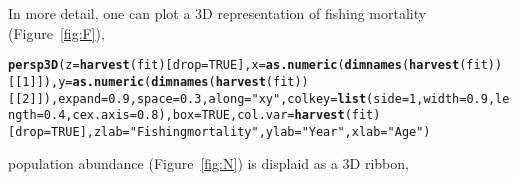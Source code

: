 \documentclass[a4paper,english,10pt]{article}\usepackage[]{graphicx}\usepackage[]{color}
\makeatletter
\newcommand{\hlnum}[1]{\textcolor[rgb]{0.686,0.059,0.569}{#1}}%
\newcommand{\hlstr}[1]{\textcolor[rgb]{0.192,0.494,0.8}{#1}}%
\newcommand{\hlstd}[1]{\textcolor[rgb]{0.345,0.345,0.345}{#1}}%
\newcommand{\hlkwc}[1]{\textcolor[rgb]{0.333,0.667,0.333}{#1}}%
\newcommand{\hlkwd}[1]{\textcolor[rgb]{0.737,0.353,0.396}{\textbf{#1}}}%
\newenvironment{kframe}{%
 \def\at@end@of@kframe{}%
 \ifinner\ifhmode%
  \def\at@end@of@kframe{\end{minipage}}%
  \begin{minipage}{\columnwidth}%
 \fi\fi%
 \def\FrameCommand##1{\hskip\@totalleftmargin \hskip-\fboxsep
 \colorbox{shadecolor}{##1}\hskip-\fboxsep
     \hskip-\linewidth \hskip-\@totalleftmargin \hskip\columnwidth}%
 \MakeFramed {\advance\hsize-\width
   \@totalleftmargin\z@ \linewidth\hsize
   \@setminipage}}%
 {\par\unskip\endMakeFramed%
 \at@end@of@kframe}
\newenvironment{knitrout}{}{} %
\makeatother
\begin{document}
In more detail, one can plot a 3D representation of fishing mortality (Figure~\ref{fig:F}),

\begin{knitrout}
\color{fgcolor}\begin{kframe}
\begin{alltt}
\hlkwd{persp3D}\hlstd{(}\hlkwc{z}\hlstd{=}\hlkwd{harvest}\hlstd{(fit)[}\hlkwc{drop}\hlstd{=}\hlnum{TRUE}\hlstd{],} \hlkwc{x}\hlstd{=}\hlkwd{as.numeric}\hlstd{(}\hlkwd{dimnames}\hlstd{(}\hlkwd{harvest}\hlstd{(fit))[[}\hlnum{1}\hlstd{]]),} \hlkwc{y}\hlstd{=}\hlkwd{as.numeric}\hlstd{(}\hlkwd{dimnames}\hlstd{(}\hlkwd{harvest}\hlstd{(fit))[[}\hlnum{2}\hlstd{]]),} \hlkwc{expand} \hlstd{=} \hlnum{0.9}\hlstd{,} \hlkwc{space} \hlstd{=} \hlnum{0.3}\hlstd{,} \hlkwc{along} \hlstd{=} \hlstr{"xy"}\hlstd{,} \hlkwc{colkey} \hlstd{=} \hlkwd{list}\hlstd{(}\hlkwc{side}\hlstd{=}\hlnum{1}\hlstd{,} \hlkwc{width} \hlstd{=} \hlnum{0.9}\hlstd{,} \hlkwc{length} \hlstd{=} \hlnum{0.4}\hlstd{,} \hlkwc{cex.axis} \hlstd{=} \hlnum{0.8}\hlstd{),} \hlkwc{box} \hlstd{=} \hlnum{TRUE}\hlstd{,} \hlkwc{col.var}\hlstd{=}\hlkwd{harvest}\hlstd{(fit)[}\hlkwc{drop}\hlstd{=}\hlnum{TRUE}\hlstd{],} \hlkwc{zlab}\hlstd{=}\hlstr{"Fishing mortality"}\hlstd{,} \hlkwc{ylab}\hlstd{=}\hlstr{"Year"}\hlstd{,} \hlkwc{xlab}\hlstd{=}\hlstr{"Age"}\hlstd{)}
\end{alltt}


{\ttfamily\noindent\bfseries{}}\end{kframe}
\end{knitrout}

population abundance (Figure~\ref{fig:N}) is displaid as a 3D ribbon, 
\end{document}
